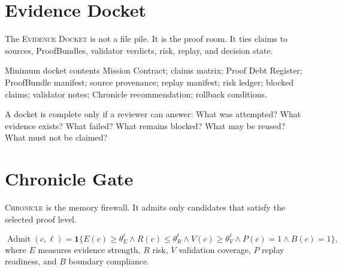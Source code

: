 \documentclass[11pt]{article}
\newcommand{\Chronicle}{\textsc{Chronicle}}
\newcommand{\EvidenceDocket}{\textsc{Evidence Docket}}
\begin{document}
\section{Evidence Docket}
The \EvidenceDocket{} is not a file pile. It is the proof room. It ties claims to sources, ProofBundles, validator verdicts, risk, replay, and decision state.

\begin{notebox}{Minimum docket contents}
Mission Contract; claims matrix; Proof Debt Register; ProofBundle manifest; source provenance; replay manifest; risk ledger; blocked claims; validator notes; Chronicle recommendation; rollback conditions.
\end{notebox}

A docket is complete only if a reviewer can answer: What was attempted? What evidence exists? What failed? What remains blocked? What may be reused? What must not be claimed?

\section{Chronicle Gate}
\Chronicle{} is the memory firewall. It admits only candidates that satisfy the selected proof level.

\begin{equation}
\operatorname{Admit}(c,\ell)=\mathbf{1}\{E(c)\geq\theta_E^\ell \wedge R(c)\leq\theta_R^\ell \wedge V(c)\geq\theta_V^\ell \wedge P(c)=1 \wedge B(c)=1\},
\end{equation}
where $E$ measures evidence strength, $R$ risk, $V$ validation coverage, $P$ replay readiness, and $B$ boundary compliance.
\end{document}

